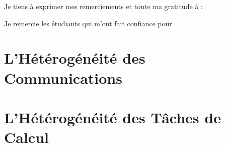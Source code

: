 \documentclass[final,twoside]{hdr} %
\begin{document}
\begin{thanks}
{Je tiens à exprimer mes remerciements et toute ma gratitude à :}

%
%
%
%
%
\item Je remercie les étudiants qui m'ont fait confiance pour
%
\end{thanks}

\tableofcontents




\chapter{L'Hétérogénéité des Communications\label{chap:grids}}



\chapter{L'Hétérogénéité des Tâches de Calcul\label{chap:amide}}
\end{document}
